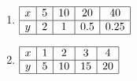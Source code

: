 \begin{multicols}{2}
\begin{enumerate}[noitemsep, label = \color{blue}\arabic*. ]
    \item 
    $
    \begin{array}{|c|c|c|c|c|}
        \hline
        x & 5 & 10 & 20 & 40 \\ \hline
        y & 2 & 1 & 0.5 & 0.25 \\ \hline
    \end{array}
    $
    
    
    
    
    \item 
    $
    \begin{array}{|c|c|c|c|c|}
        \hline
        x & 1 & 2 & 3 & 4 \\ \hline
        y & 5 & 10 & 15 & 20 \\ \hline
    \end{array}
    $
    
\end{enumerate}
\end{multicols}

